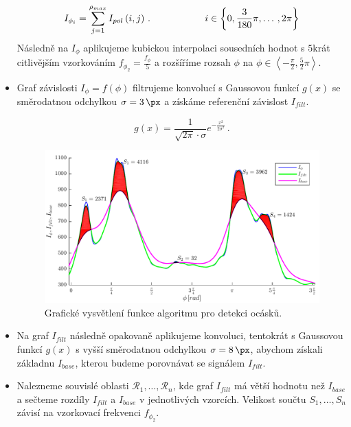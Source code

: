 \begin{itemize}
	\begin{equation}
	I_{\phi_i} = \sum_{j = 1}^{\rho_{max}} I_{pol}\left(i,j\right)\,. \hspace*{2cm} i \in \left\lbrace 0, \frac{3}{180}\pi, \dots \,,2\pi \right\rbrace
	\label{eq:Isuma}
	\end{equation}
	Následně na $I_{\phi}$ aplikujeme kubickou interpolaci sousedních hodnot s $5$krát citlivějším vzorkováním $f_{\phi_2} = \frac{f_{\phi}}{5}$ a rozšíříme rozsah $\phi$ na $\phi \in \left\langle -\frac{\pi}{2},\frac{5}{2}\pi \right\rangle$. 
	
	\item Graf závislosti $I_\phi = f(\phi)$ filtrujeme konvolucí s Gaussovou funkcí $g(x)$ se směrodatnou odchylkou $\sigma = \SI{3}{\px}$ a získáme referenční závislost $I_{filt}$.
	
	\begin{equation}
		g(x) = \frac{1}{\sqrt{2\pi} \cdot \sigma}e^{-\frac{x^2}{2\sigma^2}}\,.
	\end{equation}
	
	\begin{figure}[htbp]
    \centering\includegraphics[width=\textwidth]{figures/tailex05.pdf}
     \caption[Detekce ocásků - zpracování polárního grafu.]{Grafické vysvětlení funkce algoritmu pro detekci ocásků. }
    \label{fig:tailSumGraph}
	\end{figure}
	
	\item Na graf $I_{filt}$ následně opakovaně aplikujeme konvoluci, tentokrát s Gaussovou funkcí $g(x)$ s vyšší směrodatnou odchylkou $\sigma = \SI{8}{\px}$, abychom získali základnu $I_{base}$, kterou budeme porovnávat se signálem $I_{filt}$.
	
	\item Nalezneme souvislé oblasti $\mathcal{R}_1, \dots , \mathcal{R}_n$, kde graf $I_{filt}$ má větší hodnotu než $I_{base}$ a sečteme rozdíly $I_{filt}$ a $I_{base}$ v jednotlivých vzorcích. Velikost součtu $S_1, \dots , S_n$ závisí na vzorkovací frekvenci $f_{\phi_2}$.
	

\end{itemize}
